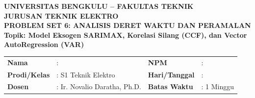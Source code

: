 \documentclass[11pt,a4paper]{article}
\begin{document}
\begin{center}
    {\large \textbf{\color{primaryblue}UNIVERSITAS BENGKULU -- FAKULTAS TEKNIK}}\\[0.1cm]
    {\large \textbf{\color{secondaryblue}JURUSAN TEKNIK ELEKTRO}}\\[0.2cm]
    {\LARGE \textbf{\color{primaryblue}PROBLEM SET 6: ANALISIS DERET WAKTU DAN PERAMALAN}}\\[0.1cm]
    {\normalsize \textbf{Topik: Model Eksogen SARIMAX, Korelasi Silang (CCF), dan Vector AutoRegression (VAR)}}
\end{center}

\vspace{0.1cm}

\begin{tcolorbox}[colback=boxbg,colframe=primaryblue,arc=2mm,title=\textbf{Informasi Tugas \& Identitas Mahasiswa}]
\small
\begin{tabular}{p{2.2cm}p{5.5cm}p{2.2cm}p{5.0cm}}
\textbf{Nama} & : \dotfill & \textbf{NPM} & : \dotfill \\
\textbf{Prodi/Kelas} & : S1 Teknik Elektro & \textbf{Hari/Tanggal} & : \dotfill \\
\textbf{Dosen} & : Ir. Novalio Daratha, Ph.D. & \textbf{Batas Waktu} & : 1 Minggu \\
\end{tabular}
\end{tcolorbox}

\vspace{0.2cm}
\end{document}
